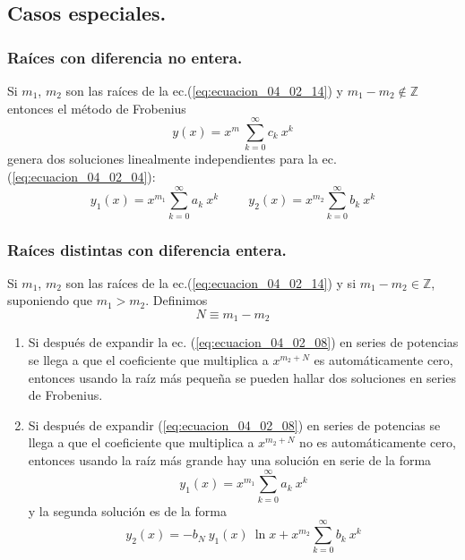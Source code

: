 \subsection{Casos especiales.}
\subsubsection{Raíces con diferencia no entera.}
Si $m_{1}$, $m_{2}$ son las raíces de la ec.(\ref{eq:ecuacion_04_02_14}) y $m_{1} - m_{2} \not \in \mathbb{Z}$ entonces el método de Frobenius
\begin{equation}
y(x) = x^{m} \: \sum_{k=0}^{\infty} c_{k} \: x^{k}
\label{eq:ecuacion_04_02_15}
\end{equation}
genera dos soluciones linealmente independientes para la ec. (\ref{eq:ecuacion_04_02_04}):
\begin{equation}
y_{1}(x) = x^{m_{1}} \sum_{k=0}^{\infty} a_{k} \: x^{k} \hspace{1cm} y_{2}(x) = x^{m_{2}} \sum_{k=0}^{\infty} b_{k} \: x^{k}
\label{eq:ecuacion_04_02_16}
\end{equation}
\subsubsection{Raíces distintas con diferencia entera.}
Si $m_{1}$, $m_{2}$ son las raíces de la ec.(\ref{eq:ecuacion_04_02_14}) y si $m_{1} - m_{2} \in \mathbb{Z}$, suponiendo que $m_{1} > m_{2}$. Definimos
\begin{equation}
N \equiv m_{1} - m_{2}
\label{eq:ecuacion_04_02_37}
\end{equation}
\begin{enumerate}
\item Si después de expandir la ec. (\ref{eq:ecuacion_04_02_08}) en series de potencias se llega a que el coeficiente que multiplica a $x^{m_{2}+N}$ es automáticamente cero, entonces usando la raíz más pequeña se pueden hallar dos soluciones en series de Frobenius.
\item Si después de expandir (\ref{eq:ecuacion_04_02_08}) en series de potencias se llega a que el coeficiente que multiplica a $x^{m_{2}+N}$ no es automáticamente cero, entonces usando la raíz más grande hay una solución en serie de la forma
\begin{equation}
y_{1}(x) = x^{m_{1}} \sum_{k=0}^{\infty} a_{k} \: x^{k}
\label{eq:ecuacion_04_02_38}
\end{equation}
y la segunda solución es de la forma
\begin{equation}
y_{2}(x) = - b_{N} \: y_{1}(x) \: \ln x + x^{m_{2}} \sum_{k=0}^{\infty} b_{k} \: x^{k}
\label{eq:ecuacion_04_02_39}
\end{equation}
\end{enumerate}
